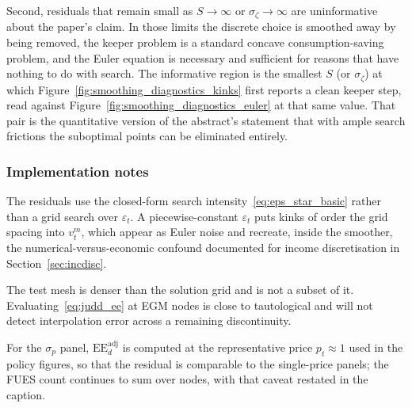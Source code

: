 Second, residuals that remain small as $S\to\infty$ or $\sigma_\zeta\to\infty$ are uninformative about the paper's claim. In those limits the discrete choice is smoothed away by being removed, the keeper problem is a standard concave consumption-saving problem, and the Euler equation is necessary and sufficient for reasons that have nothing to do with search. The informative region is the smallest $S$ (or $\sigma_\zeta$) at which Figure~\ref{fig:smoothing_diagnostics_kinks} first reports a clean keeper step, read against Figure~\ref{fig:smoothing_diagnostics_euler} at that same value. That pair is the quantitative version of the abstract's statement that with ample search frictions the suboptimal points can be eliminated entirely.

\subsubsection{Implementation notes}

The residuals use the closed-form search intensity~\eqref{eq:eps_star_basic} rather than a grid search over $\varepsilon_t$. A piecewise-constant $\varepsilon_t$ puts kinks of order the grid spacing into $v_t^{m}$, which appear as Euler noise and recreate, inside the smoother, the numerical-versus-economic confound documented for income discretisation in Section~\ref{sec:incdisc}.

The test mesh is denser than the solution grid and is not a subset of it. Evaluating~\eqref{eq:judd_ee} at EGM nodes is close to tautological and will not detect interpolation error across a remaining discontinuity.

For the $\sigma_p$ panel, $\mathrm{EE}_d^{\mathrm{adj}}$ is computed at the representative price $p_t\approx 1$ used in the policy figures, so that the residual is comparable to the single-price panels; the FUES count continues to sum over nodes, with that caveat restated in the caption.
